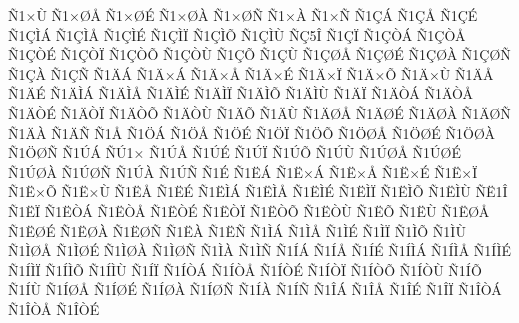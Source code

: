 {^^d11^^d7^^d9
^^d11^^d7^^d8^^c5
^^d11^^d7^^d8^^c9
^^d11^^d7^^d8^^c0
^^d11^^d7^^d8^^d1
^^d11^^d7^^c0
^^d11^^d7^^d1
^^d11^^c7^^c1
^^d11^^c7^^c5
^^d11^^c7^^c9
^^d11^^c7^^cc^^c1
^^d11^^c7^^cc^^c5
^^d11^^c7^^cc^^c9
^^d11^^c7^^cc^^cf
^^d11^^c7^^cc^^d5
^^d11^^c7^^cc^^d9
^^d1^^c75^^ce
^^d11^^c7^^cf
^^d11^^c7^^d2^^c1
^^d11^^c7^^d2^^c5
^^d11^^c7^^d2^^c9
^^d11^^c7^^d2^^cf
^^d11^^c7^^d2^^d5
^^d11^^c7^^d2^^d9
^^d11^^c7^^d5
^^d11^^c7^^d9
^^d11^^c7^^d8^^c5
^^d11^^c7^^d8^^c9
^^d11^^c7^^d8^^c0
^^d11^^c7^^d8^^d1
^^d11^^c7^^c0
^^d11^^c7^^d1
^^d11^^c4^^c1
^^d11^^c4^^d7^^c1
^^d11^^c4^^d7^^c5
^^d11^^c4^^d7^^c9
^^d11^^c4^^d7^^cf
^^d11^^c4^^d7^^d5
^^d11^^c4^^d7^^d9
^^d11^^c4^^c5
^^d11^^c4^^c9
^^d11^^c4^^cc^^c1
^^d11^^c4^^cc^^c5
^^d11^^c4^^cc^^c9
^^d11^^c4^^cc^^cf
^^d11^^c4^^cc^^d5
^^d11^^c4^^cc^^d9
^^d11^^c4^^cf
^^d11^^c4^^d2^^c1
^^d11^^c4^^d2^^c5
^^d11^^c4^^d2^^c9
^^d11^^c4^^d2^^cf
^^d11^^c4^^d2^^d5
^^d11^^c4^^d2^^d9
^^d11^^c4^^d5
^^d11^^c4^^d9
^^d11^^c4^^d8^^c5
^^d11^^c4^^d8^^c9
^^d11^^c4^^d8^^c0
^^d11^^c4^^d8^^d1
^^d11^^c4^^c0
^^d11^^c4^^d1
^^d11^^c5
^^d11^^d6^^c1
^^d11^^d6^^c5
^^d11^^d6^^c9
^^d11^^d6^^cf
^^d11^^d6^^d5
^^d11^^d6^^d8^^c5
^^d11^^d6^^d8^^c9
^^d11^^d6^^d8^^c0
^^d11^^d6^^d8^^d1
^^d11^^da^^c1
^^d1^^da1^^d7
^^d11^^da^^c5
^^d11^^da^^c9
^^d11^^da^^cf
^^d11^^da^^d5
^^d11^^da^^d9
^^d11^^da^^d8^^c5
^^d11^^da^^d8^^c9
^^d11^^da^^d8^^c0
^^d11^^da^^d8^^d1
^^d11^^da^^c0
^^d11^^da^^d1
^^d11^^c9
^^d11^^cb^^c1
^^d11^^cb^^d7^^c1
^^d11^^cb^^d7^^c5
^^d11^^cb^^d7^^c9
^^d11^^cb^^d7^^cf
^^d11^^cb^^d7^^d5
^^d11^^cb^^d7^^d9
^^d11^^cb^^c5
^^d11^^cb^^c9
^^d11^^cb^^cc^^c1
^^d11^^cb^^cc^^c5
^^d11^^cb^^cc^^c9
^^d11^^cb^^cc^^cf
^^d11^^cb^^cc^^d5
^^d11^^cb^^cc^^d9
^^d1^^cb1^^ce
^^d11^^cb^^cf
^^d11^^cb^^d2^^c1
^^d11^^cb^^d2^^c5
^^d11^^cb^^d2^^c9
^^d11^^cb^^d2^^cf
^^d11^^cb^^d2^^d5
^^d11^^cb^^d2^^d9
^^d11^^cb^^d5
^^d11^^cb^^d9
^^d11^^cb^^d8^^c5
^^d11^^cb^^d8^^c9
^^d11^^cb^^d8^^c0
^^d11^^cb^^d8^^d1
^^d11^^cb^^c0
^^d11^^cb^^d1
^^d11^^cc^^c1
^^d11^^cc^^c5
^^d11^^cc^^c9
^^d11^^cc^^cf
^^d11^^cc^^d5
^^d11^^cc^^d9
^^d11^^cc^^d8^^c5
^^d11^^cc^^d8^^c9
^^d11^^cc^^d8^^c0
^^d11^^cc^^d8^^d1
^^d11^^cc^^c0
^^d11^^cc^^d1
^^d11^^cd^^c1
^^d11^^cd^^c5
^^d11^^cd^^c9
^^d11^^cd^^cc^^c1
^^d11^^cd^^cc^^c5
^^d11^^cd^^cc^^c9
^^d11^^cd^^cc^^cf
^^d11^^cd^^cc^^d5
^^d11^^cd^^cc^^d9
^^d11^^cd^^cf
^^d11^^cd^^d2^^c1
^^d11^^cd^^d2^^c5
^^d11^^cd^^d2^^c9
^^d11^^cd^^d2^^cf
^^d11^^cd^^d2^^d5
^^d11^^cd^^d2^^d9
^^d11^^cd^^d5
^^d11^^cd^^d9
^^d11^^cd^^d8^^c5
^^d11^^cd^^d8^^c9
^^d11^^cd^^d8^^c0
^^d11^^cd^^d8^^d1
^^d11^^cd^^c0
^^d11^^cd^^d1
^^d11^^ce^^c1
^^d11^^ce^^c5
^^d11^^ce^^c9
^^d11^^ce^^cf
^^d11^^ce^^d2^^c1
^^d11^^ce^^d2^^c5
^^d11^^ce^^d2^^c9
}
